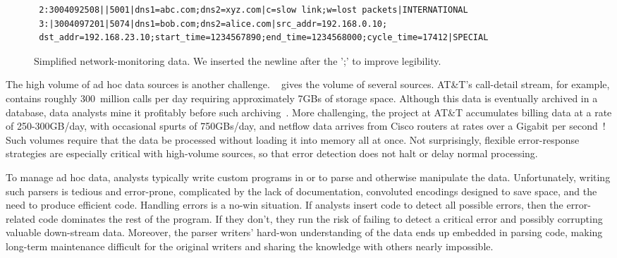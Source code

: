 \begin{figure*}
  \centering
  \small
\begin{verbatim}
 2:3004092508||5001|dns1=abc.com;dns2=xyz.com|c=slow link;w=lost packets|INTERNATIONAL
 3:|3004097201|5074|dns1=bob.com;dns2=alice.com|src_addr=192.168.0.10;
 dst_addr=192.168.23.10;start_time=1234567890;end_time=1234568000;cycle_time=17412|SPECIAL
\end{verbatim}  
  \caption{Simplified network-monitoring data. We inserted the newline
    after the ';' to improve legibility.}
  \label{fig:darkstar-records1}
\end{figure*}






The high volume of ad hoc data sources is another challenge.
~ gives the volume of several sources.
AT\&T's call-detail stream, for example, contains roughly 300~million
calls per day requiring approximately 7GBs of storage space.  Although
this data is eventually archived in a database, data analysts mine it
profitably before such archiving~\cite{kdd98,kdd99}.  More
challenging, the \ningaui{} project at AT\&T accumulates billing data
at a rate of 250-300GB/day, with occasional spurts of 750GBs/day, and
netflow data arrives from Cisco routers at rates over a Gigabit per
second~\cite{gigascope}!  Such volumes require that the data be
processed without loading it into memory all at once.  Not
surprisingly, flexible error-response strategies are especially
critical with high-volume sources, so that error detection does not
halt or delay normal processing.


To manage ad hoc data, analysts typically write custom programs in
\C{} or \perl{} to parse and otherwise manipulate the data. 
Unfortunately, writing such parsers is tedious and error-prone,
complicated by the lack of documentation, convoluted encodings
designed to save space, and the need to produce efficient code.
Handling errors is a no-win situation.  If analysts insert code
to detect all possible errors, then the error-related code dominates
the rest of the program. If they don't, they run the risk of
failing to detect a critical error and possibly corrupting valuable
down-stream data.  Moreover, the parser writers'
hard-won understanding of the data ends up embedded in parsing code,
making long-term maintenance difficult for the original writers and
sharing the knowledge with others nearly impossible.

